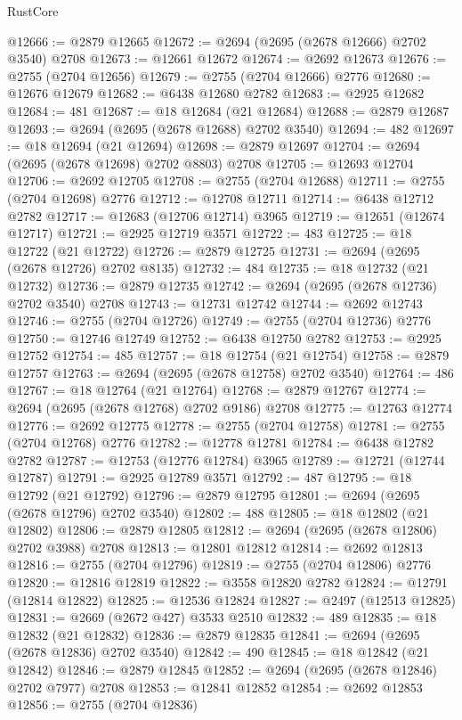 \begin{lexlean}{RustCore}
\begin{coremodule}
@12666 := @2879 @12665
@12672 := @2694 (@2695 (@2678 @12666) @2702 @3540) @2708
@12673 := @12661 @12672
@12674 := @2692 @12673
@12676 := @2755 (@2704 @12656)
@12679 := @2755 (@2704 @12666) @2776
@12680 := @12676 @12679
@12682 := @6438 @12680 @2782
@12683 := @2925 @12682
@12684 := 481
@12687 := @18 @12684 (@21 @12684)
@12688 := @2879 @12687
@12693 := @2694 (@2695 (@2678 @12688) @2702 @3540)
@12694 := 482
@12697 := @18 @12694 (@21 @12694)
@12698 := @2879 @12697
@12704 := @2694 (@2695 (@2678 @12698) @2702 @8803) @2708
@12705 := @12693 @12704
@12706 := @2692 @12705
@12708 := @2755 (@2704 @12688)
@12711 := @2755 (@2704 @12698) @2776
@12712 := @12708 @12711
@12714 := @6438 @12712 @2782
@12717 := @12683 (@12706 @12714) @3965
@12719 := @12651 (@12674 @12717)
@12721 := @2925 @12719 @3571
@12722 := 483
@12725 := @18 @12722 (@21 @12722)
@12726 := @2879 @12725
@12731 := @2694 (@2695 (@2678 @12726) @2702 @8135)
@12732 := 484
@12735 := @18 @12732 (@21 @12732)
@12736 := @2879 @12735
@12742 := @2694 (@2695 (@2678 @12736) @2702 @3540) @2708
@12743 := @12731 @12742
@12744 := @2692 @12743
@12746 := @2755 (@2704 @12726)
@12749 := @2755 (@2704 @12736) @2776
@12750 := @12746 @12749
@12752 := @6438 @12750 @2782
@12753 := @2925 @12752
@12754 := 485
@12757 := @18 @12754 (@21 @12754)
@12758 := @2879 @12757
@12763 := @2694 (@2695 (@2678 @12758) @2702 @3540)
@12764 := 486
@12767 := @18 @12764 (@21 @12764)
@12768 := @2879 @12767
@12774 := @2694 (@2695 (@2678 @12768) @2702 @9186) @2708
@12775 := @12763 @12774
@12776 := @2692 @12775
@12778 := @2755 (@2704 @12758)
@12781 := @2755 (@2704 @12768) @2776
@12782 := @12778 @12781
@12784 := @6438 @12782 @2782
@12787 := @12753 (@12776 @12784) @3965
@12789 := @12721 (@12744 @12787)
@12791 := @2925 @12789 @3571
@12792 := 487
@12795 := @18 @12792 (@21 @12792)
@12796 := @2879 @12795
@12801 := @2694 (@2695 (@2678 @12796) @2702 @3540)
@12802 := 488
@12805 := @18 @12802 (@21 @12802)
@12806 := @2879 @12805
@12812 := @2694 (@2695 (@2678 @12806) @2702 @3988) @2708
@12813 := @12801 @12812
@12814 := @2692 @12813
@12816 := @2755 (@2704 @12796)
@12819 := @2755 (@2704 @12806) @2776
@12820 := @12816 @12819
@12822 := @3558 @12820 @2782
@12824 := @12791 (@12814 @12822)
@12825 := @12536 @12824
@12827 := @2497 (@12513 @12825)
@12831 := @2669 (@2672 @427) @3533 @2510
@12832 := 489
@12835 := @18 @12832 (@21 @12832)
@12836 := @2879 @12835
@12841 := @2694 (@2695 (@2678 @12836) @2702 @3540)
@12842 := 490
@12845 := @18 @12842 (@21 @12842)
@12846 := @2879 @12845
@12852 := @2694 (@2695 (@2678 @12846) @2702 @7977) @2708
@12853 := @12841 @12852
@12854 := @2692 @12853
@12856 := @2755 (@2704 @12836)

\end{coremodule}
\end{lexlean}
